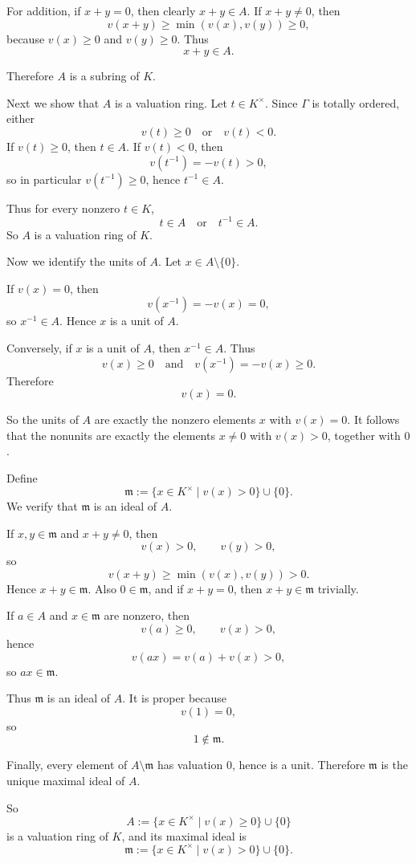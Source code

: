 \documentclass[12pt,a4paper]{article}
\theoremstyle{notespace}
\begin{document}
For addition, if \(x+y=0\), then clearly \(x+y\in A\). If \(x+y\neq 0\), then
\[
v(x+y)\ge \min(v(x),v(y))\ge 0,
\]
because \(v(x)\ge 0\) and \(v(y)\ge 0\). Thus
\[
x+y\in A.
\]

Therefore \(A\) is a subring of \(K\).

\medskip

Next we show that \(A\) is a valuation ring. Let \(t\in K^\times\). Since \(\Gamma\) is totally ordered, either
\[
v(t)\ge 0
\quad\text{or}\quad
v(t)<0.
\]
If \(v(t)\ge 0\), then \(t\in A\). If \(v(t)<0\), then
\[
v(t^{-1})=-v(t)>0,
\]
so in particular \(v(t^{-1})\ge 0\), hence \(t^{-1}\in A\).

Thus for every nonzero \(t\in K\),
\[
t\in A \quad\text{or}\quad t^{-1}\in A.
\]
So \(A\) is a valuation ring of \(K\).

\medskip

Now we identify the units of \(A\). Let \(x\in A\setminus\{0\}\).

If \(v(x)=0\), then
\[
v(x^{-1})=-v(x)=0,
\]
so \(x^{-1}\in A\). Hence \(x\) is a unit of \(A\).

Conversely, if \(x\) is a unit of \(A\), then \(x^{-1}\in A\). Thus
\[
v(x)\ge 0
\quad\text{and}\quad
v(x^{-1})=-v(x)\ge 0.
\]
Therefore
\[
v(x)=0.
\]

So the units of \(A\) are exactly the nonzero elements \(x\) with \(v(x)=0\). It follows that the nonunits are exactly the elements \(x\neq 0\) with \(v(x)>0\), together with \(0\).

Define
\[
\mathfrak m:=\{x\in K^\times\mid v(x)>0\}\cup\{0\}.
\]
We verify that \(\mathfrak m\) is an ideal of \(A\).

If \(x,y\in \mathfrak m\) and \(x+y\neq 0\), then
\[
v(x)>0,\qquad v(y)>0,
\]
so
\[
v(x+y)\ge \min(v(x),v(y))>0.
\]
Hence \(x+y\in \mathfrak m\). Also \(0\in \mathfrak m\), and if \(x+y=0\), then \(x+y\in \mathfrak m\) trivially.

If \(a\in A\) and \(x\in \mathfrak m\) are nonzero, then
\[
v(a)\ge 0,\qquad v(x)>0,
\]
hence
\[
v(ax)=v(a)+v(x)>0,
\]
so \(ax\in \mathfrak m\).

Thus \(\mathfrak m\) is an ideal of \(A\). It is proper because
\[
v(1)=0,
\]
so
\[
1\notin \mathfrak m.
\]

Finally, every element of \(A\setminus \mathfrak m\) has valuation \(0\), hence is a unit. Therefore \(\mathfrak m\) is the unique maximal ideal of \(A\).

So
\[
A:=\{x\in K^\times\mid v(x)\ge 0\}\cup\{0\}
\]
is a valuation ring of \(K\), and its maximal ideal is
\[
\mathfrak m:=\{x\in K^\times\mid v(x)>0\}\cup\{0\}.
\]
	
\end{document}
